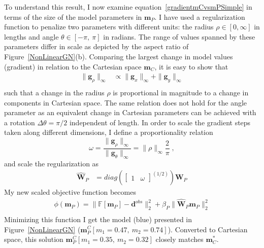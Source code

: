 To understand this result, I now examine equation~\eqref{gradientmCvsmPSimple} in terms of the size of the model parameters in $\mathbf{m}_P$.
I have used a regularization function to penalize two parameters with different units: the radius $\rho \in [0, \infty]$ in lengths and angle $\theta \in [-\pi,\: \pi]$ in radians. The range of values spanned by these parameters differ in scale as depicted by the aspect ratio of Figure~\ref{NonLinearGN}(b).
Comparing the largest change in model values (gradient) in relation to the Cartesian space $\mathbf{m}_C$, it is easy to show that
\begin{equation}
\begin{split}
{\|\mathbf{g}_\rho \|_\infty} & \propto \|\mathbf{g}_x\|_\infty + \|\mathbf{g}_y\|_\infty \\
\end{split}
\end{equation}
such that a change in the radius $\rho$ is proportional in magnitude to a change in components in Cartesian space. The same relation does not hold for the angle parameter as an equivalent change in Cartesian parameters can be achieved with a rotation $\Delta \theta=\pi/2$ independent of length.
In order to scale the gradient steps taken along different dimensions, I define a proportionality relation
\begin{equation}\label{unitScale}
\omega = \frac{\|\mathbf{g}_\rho \|_\infty}{\|\mathbf{g}_\theta \|_\infty} = \|\rho\|_\infty \frac{2}{\pi} \;,
\end{equation}
and scale the regularization as
\begin{equation}
\begin{split}
\mathbf{\hat W}_P &= diag\left(
\begin{bmatrix}
1 &
\omega
\end{bmatrix}^{(1/2)}\right) \mathbf{W}_P
\end{split}
\end{equation}
My new scaled objective function becomes
\begin{equation}\label{toyPolar}
\begin{split}
\phi(\mathbf{m}_P) = \| \mathbb{F}[\mathbf{m}_P] - \mathbf{d}^{obs} \|_2^2 + \beta_P \| \mathbf{\hat W}_P \mathbf{m}_P \|_2^2 \\
\end{split}
\end{equation}
Minimizing this function I get the model (blue) presented in Figure~\ref{NonLinearGN} ($\mathbf{m}_P^C[m_1=0.47,\: m_2=0.74]$). Converted to Cartesian space, this solution $\mathbf{m}_P^C[m_1=0.35,\: m_2=0.32]$ closely matches $\mathbf{m}^*_C$. 



